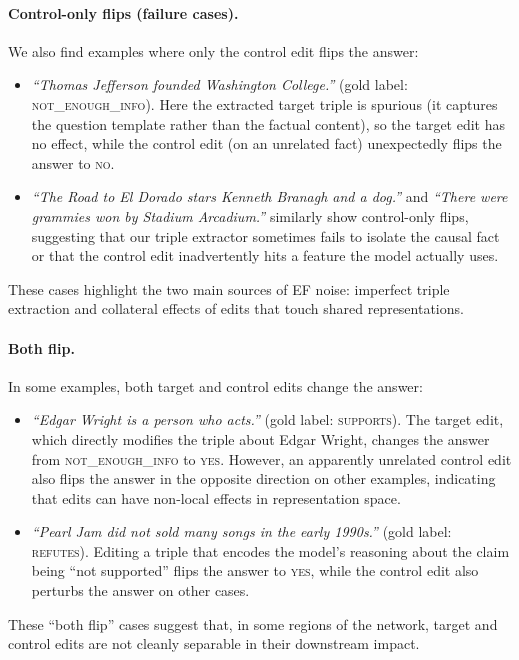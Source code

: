 \documentclass[11pt]{article}
\begin{document}
\paragraph{Control-only flips (failure cases).}
We also find examples where only the control edit flips the answer:
\begin{itemize}
  \item \emph{``Thomas Jefferson founded Washington College.''} (gold label: \textsc{not\_enough\_info}). Here the extracted target triple is spurious (it captures the question template rather than the factual content), so the target edit has no effect, while the control edit (on an unrelated fact) unexpectedly flips the answer to \textsc{no}.
  \item \emph{``The Road to El Dorado stars Kenneth Branagh and a dog.''} and \emph{``There were grammies won by Stadium Arcadium.''} similarly show control-only flips, suggesting that our triple extractor sometimes fails to isolate the causal fact or that the control edit inadvertently hits a feature the model actually uses.
\end{itemize}
These cases highlight the two main sources of EF noise: imperfect triple extraction and collateral effects of edits that touch shared representations.

\paragraph{Both flip.}
In some examples, both target and control edits change the answer:
\begin{itemize}
  \item \emph{``Edgar Wright is a person who acts.''} (gold label: \textsc{supports}). The target edit, which directly modifies the triple about Edgar Wright, changes the answer from \textsc{not\_enough\_info} to \textsc{yes}. However, an apparently unrelated control edit also flips the answer in the opposite direction on other examples, indicating that edits can have non-local effects in representation space.
  \item \emph{``Pearl Jam did not sold many songs in the early 1990s.''} (gold label: \textsc{refutes}). Editing a triple that encodes the model's reasoning about the claim being ``not supported'' flips the answer to \textsc{yes}, while the control edit also perturbs the answer on other cases.
\end{itemize}
These ``both flip'' cases suggest that, in some regions of the network, target and control edits are not cleanly separable in their downstream impact.
\end{document}
